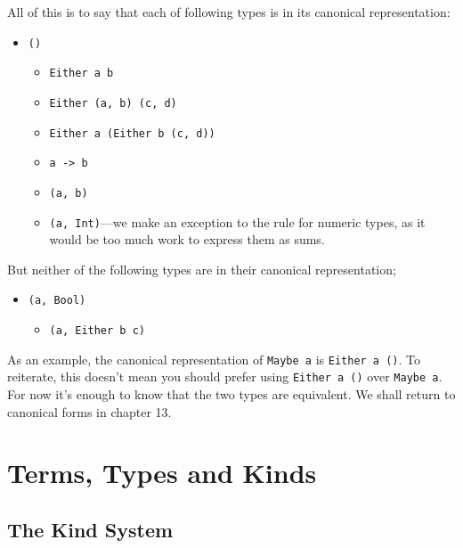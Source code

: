 \documentclass[
  11pt,
]{book}
\providecommand{\tightlist}{%
  \setlength{\itemsep}{0pt}\setlength{\parskip}{0pt}}
\theoremstyle{nonumberplain}
\begin{document}
All of this is to say that each of following types is in its canonical
representation:

\begin{itemize}
\tightlist
\item
  \texttt{()}

  \begin{itemize}
  \tightlist
  \item
    \texttt{Either\ a\ b}
  \item
    \texttt{Either\ (a,\ b)\ (c,\ d)}
  \item
    \texttt{Either\ a\ (Either\ b\ (c,\ d))}
  \item
    \texttt{a\ -\textgreater{}\ b}
  \item
    \texttt{(a,\ b)}
  \item
    \texttt{(a,\ Int)}---we make an exception to the rule for numeric
    types, as it would be too much work to express them as sums.
  \end{itemize}
\end{itemize}

But neither of the following types are in their canonical
representation;

\begin{itemize}
\tightlist
\item
  \texttt{(a,\ Bool)}

  \begin{itemize}
  \tightlist
  \item
    \texttt{(a,\ Either\ b\ c)}
  \end{itemize}
\end{itemize}

As an example, the canonical representation of \texttt{Maybe\ a} is
\texttt{Either\ a\ ()}. To reiterate, this doesn't mean you should
prefer using \texttt{Either\ a\ ()} over \texttt{Maybe\ a}. For now it's
enough to know that the two types are equivalent. We shall return to
canonical forms in chapter 13.

\hypertarget{terms-types-and-kinds}{%
\chapter{Terms, Types and Kinds}\label{terms-types-and-kinds}}

\hypertarget{the-kind-system}{%
\section{The Kind System}\label{the-kind-system}}
\end{document}
